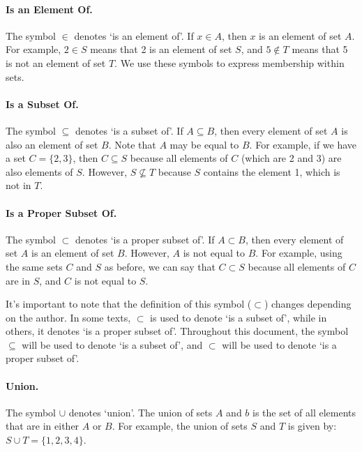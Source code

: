 \documentclass[a4paper, twoside]{article}
\begin{document}
\paragraph{Is an Element Of.} The symbol \(\in\) denotes `is an element of'. If \(x \in A\), then \(x\) is an element of set \(A\). For example, \(2 \in S\) means that 2 is an element of set \(S\), and \(5 \notin T\) means that 5 is not an element of set \(T\). We use these symbols to express membership within sets.

\paragraph{Is a Subset Of.} The symbol \(\subseteq\) denotes `is a subset of'. If \(A \subseteq B\), then every element of set \(A\) is also an element of set \(B\). Note that \(A\) may be equal to \(B\). For example, if we have a set \(C = \{2, 3\}\), then \(C \subseteq S\) because all elements of \(C\) (which are 2 and 3) are also elements of \(S\). However, \(S \nsubseteq T\) because \(S\) contains the element 1, which is not in \(T\).

\paragraph{Is a Proper Subset Of.} The symbol \(\subset\) denotes `is a proper subset of'. If \(A \subset B\), then every element of set \(A\) is an element of set \(B\). However, \(A\) is not equal to \(B\). For example, using the same sets \(C\) and \(S\) as before, we can say that \(C \subset S\) because all elements of \(C\) are in \(S\), and \(C\) is not equal to \(S\).

It's important to note that the definition of this symbol (\(\subset\)) changes depending on the author. In some texts, \(\subset\) is used to denote `is a subset of', while in others, it denotes `is a proper subset of'. Throughout this document, the symbol \(\subseteq\) will be used to denote `is a subset of', and \(\subset\) will be used to denote `is a proper subset of'.

\paragraph{Union.} The symbol \(\cup\) denotes `union'. The union of sets \(A\) and \(b\) is the set of all elements that are in either \(A\) or \(B\). For example, the union of sets \(S\) and \(T\) is given by: \( S \cup T = \{ 1, 2, 3, 4 \} \).
\end{document}
